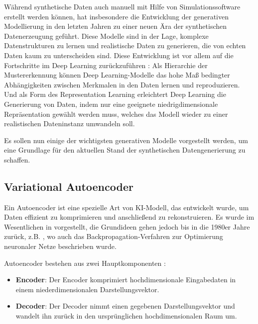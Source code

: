 Während synthetische Daten auch manuell mit Hilfe von Simulationssoftware erstellt werden können, hat insbesondere die Entwicklung der generativen Modellierung in den letzten Jahren zu einer neuen Ära der synthetischen Datenerzeugung geführt. Diese Modelle sind in der Lage, komplexe Datenstrukturen zu lernen und realistische Daten zu generieren, die von echten Daten kaum zu unterscheiden sind. Diese Entwicklung ist vor allem auf die Fortschritte im Deep Learning zurückzuführen \parencite{Foster2020gendeeplearning}: Als Hierarchie der Mustererkennung können Deep Learning-Modelle das hohe Maß bedingter Abhängigkeiten zwischen Merkmalen in den Daten lernen und reproduzieren. Und als Form des Representation Learning erleichtert Deep Learning die Generierung von Daten, indem nur eine geeignete niedrigdimensionale Repräsentation gewählt werden muss, welches das Modell wieder zu einer realistischen Dateninstanz umwandeln soll.

Es sollen nun einige der wichtigsten generativen Modelle vorgestellt werden, um eine Grundlage für den aktuellen Stand der synthetischen Datengenerierung zu schaffen.


\subsection{Variational Autoencoder} \label{subsec:vae}

Ein Autoencoder ist eine spezielle Art von KI-Modell, das entwickelt wurde, um Daten effizient zu komprimieren und anschließend zu rekonstruieren. Es wurde im Wesentlichen in \parencite{Hinton2006autoencoder} vorgestellt, die Grundideen gehen jedoch bis in die 1980er Jahre zurück, z.B. \parencite{Rumelhart1986backpropagation}, wo auch das Backpropagation-Verfahren zur Optimierung neuronaler Netze beschrieben wurde.

Autoencoder bestehen aus zwei Hauptkomponenten \parencite{Foster2020gendeeplearning}:

\begin{itemize}
	\item \textbf{Encoder}: Der Encoder komprimiert hochdimensionale Eingabedaten in einem niederdimensionalen Darstellungsvektor.
	\item \textbf{Decoder}: Der Decoder nimmt einen gegebenen Darstellungsvektor und wandelt ihn zurück in den ursprünglichen hochdimensionalen Raum um.
\end{itemize}

